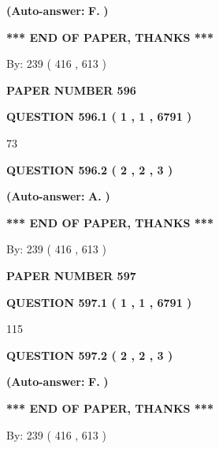 \documentclass{ctexart}
\begin{document}
 
{\textbf{(Auto-answer:}}
{\textbf{\large{
F.}}}
{\textbf{)}}
 
 
   
   
   
   
\vspace{1.0in} 
{\textbf{\large{ *** END OF PAPER, THANKS *** }}} 
   
   
\hspace{1.0in} By: 
 239 ( 416 ,  613 )
   
   
   
   
\newpage 
\setcounter{page}{ 
   596001 } 
   
   
 {\textbf{ \Large{ PAPER NUMBER  596  }}}
   
   
   
   
  
  
{\textbf{\large{QUESTION
596.1 
 ( 1 , 1 , 6791 )
}}}

73
  
  
{\textbf{\large{QUESTION
596.2 
 ( 2 , 2 , 3 )
}}}
 
 
{\textbf{(Auto-answer:}}
{\textbf{\large{
A.}}}
{\textbf{)}}
 
 
   
   
   
   
\vspace{1.0in} 
{\textbf{\large{ *** END OF PAPER, THANKS *** }}} 
   
   
\hspace{1.0in} By: 
 239 ( 416 ,  613 )
   
   
   
   
\newpage 
\setcounter{page}{ 
   597001 } 
   
   
 {\textbf{ \Large{ PAPER NUMBER  597  }}}
   
   
   
   
  
  
{\textbf{\large{QUESTION
597.1 
 ( 1 , 1 , 6791 )
}}}

115
  
  
{\textbf{\large{QUESTION
597.2 
 ( 2 , 2 , 3 )
}}}
 
 
{\textbf{(Auto-answer:}}
{\textbf{\large{
F.}}}
{\textbf{)}}
 
 
   
   
   
   
\vspace{1.0in} 
{\textbf{\large{ *** END OF PAPER, THANKS *** }}} 
   
   
\hspace{1.0in} By: 
 239 ( 416 ,  613 )
   
   
   
\end{document}
